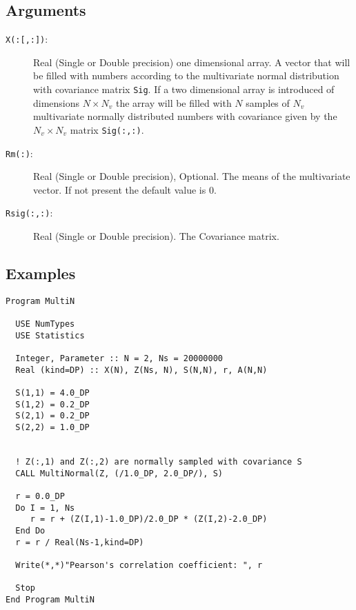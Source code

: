 \subsection{Arguments}

\begin{description}
\item[\texttt{X(:[,:])}:] Real (Single or Double precision) one
  dimensional array. A vector that will be filled with numbers
  according to the multivariate normal distribution with covariance
  matrix \texttt{Sig}. If a two dimensional array is introduced of
  dimensions $N\times N_v$ the array will be filled with $N$ samples
  of $N_v$ multivariate normally distributed numbers with covariance
  given by the $N_v\times N_v$ matrix \texttt{Sig(:,:)}.
\item[\texttt{Rm(:)}:] Real (Single or Double precision), Optional. The
  means of the multivariate vector. If not present the default value
  is 0.
\item[\texttt{Rsig(:,:)}:] Real (Single or Double precision). The
  Covariance matrix. 
\end{description}

\subsection{Examples}

\begin{lstlisting}[emph=MultiNormal,
                   emphstyle=\color{blue},
                   frame=trBL,
                   caption=Sampling a multivariate normal distribution.,
                   label=multinormal]
Program MultiN

  USE NumTypes
  USE Statistics

  Integer, Parameter :: N = 2, Ns = 20000000
  Real (kind=DP) :: X(N), Z(Ns, N), S(N,N), r, A(N,N)

  S(1,1) = 4.0_DP
  S(1,2) = 0.2_DP
  S(2,1) = 0.2_DP
  S(2,2) = 1.0_DP


  ! Z(:,1) and Z(:,2) are normally sampled with covariance S
  CALL MultiNormal(Z, (/1.0_DP, 2.0_DP/), S)

  r = 0.0_DP
  Do I = 1, Ns
     r = r + (Z(I,1)-1.0_DP)/2.0_DP * (Z(I,2)-2.0_DP)
  End Do
  r = r / Real(Ns-1,kind=DP)
  
  Write(*,*)"Pearson's correlation coefficient: ", r

  Stop
End Program MultiN
\end{lstlisting}



